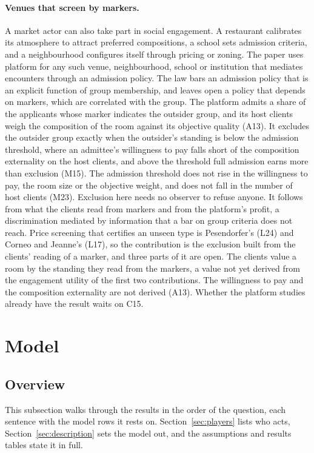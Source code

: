 \paragraph{Venues that screen by markers.} A market actor can also take
part in social engagement. A restaurant calibrates its atmosphere to
attract preferred compositions, a school sets admission criteria, and a
neighbourhood configures itself through pricing or zoning. The paper uses
platform for any such venue, neighbourhood, school or institution that
mediates encounters through an admission policy. The law bars an admission
policy that is an explicit function of group membership, and leaves open a
policy that depends on markers, which are correlated with the group. The
platform admits a share of the applicants whose marker indicates the
outsider group, and its host clients weigh the composition of the room
against its objective quality (A13). It excludes the outsider group exactly
when the outsider's standing is below the admission threshold, where an
admittee's willingness to pay falls short of the composition externality on
the host clients, and above the threshold full admission earns more than
exclusion (M15). The admission threshold does not rise in the willingness
to pay, the room size or the objective weight, and does not fall in the
number of host clients (M23). Exclusion here needs no observer to refuse
anyone. It follows from what the clients read from markers and from the
platform's profit, a discrimination mediated by information that a bar on
group criteria does not reach. Price screening that certifies an unseen
type is Pesendorfer's (L24) and Corneo and Jeanne's (L17), so the
contribution is the exclusion built from the clients' reading of a marker,
and three parts of it are open. The clients value a room by the standing
they read from the markers, a value not yet derived from the engagement utility of the first two contributions. The willingness
to pay and the composition externality are not derived (A13). Whether the
platform studies already have the result waits on C15.

\section{Model}

\subsection{Overview}

This subsection walks through the results in the order of the question,
each sentence with the model rows it rests on. Section~\ref{sec:players}
lists who acts, Section~\ref{sec:description} sets the model out, and the
assumptions and results tables state it in full.

